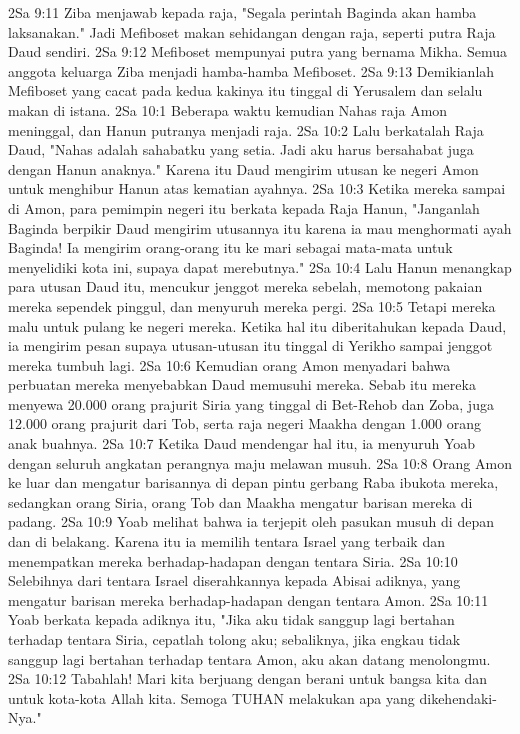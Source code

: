 2Sa 9:11  Ziba menjawab kepada raja, "Segala perintah Baginda akan hamba laksanakan." Jadi Mefiboset makan sehidangan dengan raja, seperti putra Raja Daud sendiri.
2Sa 9:12  Mefiboset mempunyai putra yang bernama Mikha. Semua anggota keluarga Ziba menjadi hamba-hamba Mefiboset.
2Sa 9:13  Demikianlah Mefiboset yang cacat pada kedua kakinya itu tinggal di Yerusalem dan selalu makan di istana.
2Sa 10:1  Beberapa waktu kemudian Nahas raja Amon meninggal, dan Hanun putranya menjadi raja.
2Sa 10:2  Lalu berkatalah Raja Daud, "Nahas adalah sahabatku yang setia. Jadi aku harus bersahabat juga dengan Hanun anaknya." Karena itu Daud mengirim utusan ke negeri Amon untuk menghibur Hanun atas kematian ayahnya.
2Sa 10:3  Ketika mereka sampai di Amon, para pemimpin negeri itu berkata kepada Raja Hanun, "Janganlah Baginda berpikir Daud mengirim utusannya itu karena ia mau menghormati ayah Baginda! Ia mengirim orang-orang itu ke mari sebagai mata-mata untuk menyelidiki kota ini, supaya dapat merebutnya."
2Sa 10:4  Lalu Hanun menangkap para utusan Daud itu, mencukur jenggot mereka sebelah, memotong pakaian mereka sependek pinggul, dan menyuruh mereka pergi.
2Sa 10:5  Tetapi mereka malu untuk pulang ke negeri mereka. Ketika hal itu diberitahukan kepada Daud, ia mengirim pesan supaya utusan-utusan itu tinggal di Yerikho sampai jenggot mereka tumbuh lagi.
2Sa 10:6  Kemudian orang Amon menyadari bahwa perbuatan mereka menyebabkan Daud memusuhi mereka. Sebab itu mereka menyewa 20.000 orang prajurit Siria yang tinggal di Bet-Rehob dan Zoba, juga 12.000 orang prajurit dari Tob, serta raja negeri Maakha dengan 1.000 orang anak buahnya.
2Sa 10:7  Ketika Daud mendengar hal itu, ia menyuruh Yoab dengan seluruh angkatan perangnya maju melawan musuh.
2Sa 10:8  Orang Amon ke luar dan mengatur barisannya di depan pintu gerbang Raba ibukota mereka, sedangkan orang Siria, orang Tob dan Maakha mengatur barisan mereka di padang.
2Sa 10:9  Yoab melihat bahwa ia terjepit oleh pasukan musuh di depan dan di belakang. Karena itu ia memilih tentara Israel yang terbaik dan menempatkan mereka berhadap-hadapan dengan tentara Siria.
2Sa 10:10  Selebihnya dari tentara Israel diserahkannya kepada Abisai adiknya, yang mengatur barisan mereka berhadap-hadapan dengan tentara Amon.
2Sa 10:11  Yoab berkata kepada adiknya itu, "Jika aku tidak sanggup lagi bertahan terhadap tentara Siria, cepatlah tolong aku; sebaliknya, jika engkau tidak sanggup lagi bertahan terhadap tentara Amon, aku akan datang menolongmu.
2Sa 10:12  Tabahlah! Mari kita berjuang dengan berani untuk bangsa kita dan untuk kota-kota Allah kita. Semoga TUHAN melakukan apa yang dikehendaki-Nya."
